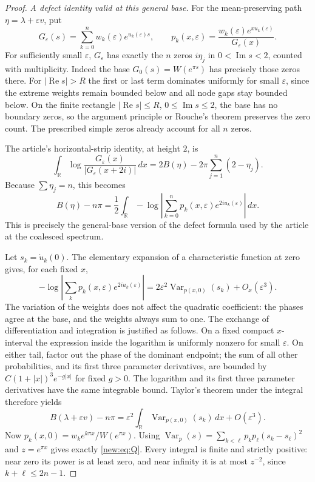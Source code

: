 \begin{proof}
\emph{A defect identity valid at this general base.}
For the mean-preserving path $\eta=\lambda+\varepsilon v$, put
\[
 G_\varepsilon(s)=\sum_{k=0}^n
                 w_k(\varepsilon)e^{u_k(\varepsilon)s},\qquad
 p_k(x,\varepsilon)=
 \frac{w_k(\varepsilon)e^{xu_k(\varepsilon)}}{G_\varepsilon(x)}.
\]
For sufficiently small $\varepsilon$, $G_\varepsilon$ has exactly the $n$
zeros $i\eta_j$ in $0<\operatorname{Im}s<2$, counted with multiplicity.
Indeed the base $G_0(s)=W(e^{\pi s})$ has precisely those zeros there.
For $|\operatorname{Re}s|>R$ the first or last term dominates uniformly
for small $\varepsilon$, since the extreme weights remain bounded below
and all node gaps stay bounded below. On the finite rectangle
$|\operatorname{Re}s|\leq R$, $0\leq\operatorname{Im}s\leq2$, the base
has no boundary zeros, so the argument principle or Rouche's theorem
preserves the zero count. The prescribed simple zeros already account for
all $n$ zeros.

The article's horizontal-strip identity, at height $2$, is
\[
 \int_{\mathbb R}\log\frac{G_\varepsilon(x)}
             {|G_\varepsilon(x+2i)|}\,dx
  =2B(\eta)-2\pi\sum_{j=1}^n(2-\eta_j).
\]
Because $\sum\eta_j=n$, this becomes
\begin{equation}\label{new:eq:defect}
 B(\eta)-n\pi
 =\frac12\int_{\mathbb R}
   -\log\left|\sum_{k=0}^np_k(x,\varepsilon)
                       e^{2iu_k(\varepsilon)}\right|\,dx.
\end{equation}
This is precisely the general-base version of the defect formula used by
the article at the coalesced spectrum.

Let $s_k=\dot u_k(0)$. The elementary expansion of a characteristic
function at zero gives, for each fixed $x$,
\[
 -\log\left|\sum_kp_k(x,\varepsilon)e^{2iu_k(\varepsilon)}\right|
 =2\varepsilon^2\operatorname{Var}_{p(x,0)}(s_k)
      +O_x(\varepsilon^3).
\]
The variation of the weights does not affect the quadratic coefficient:
the phases agree at the base, and the weights always sum to one. The
exchange of differentiation and integration is justified as follows.
On a fixed compact $x$-interval the expression inside the logarithm is
uniformly nonzero for small $\varepsilon$. On either tail, factor out
the phase of the dominant endpoint; the sum of all other probabilities,
and its first three parameter derivatives, are bounded by
$C(1+|x|)^3e^{-g|x|}$ for fixed $g>0$. The logarithm and its first three
parameter derivatives have the same integrable bound. Taylor's theorem
under the integral therefore yields
\[
 B(\lambda+\varepsilon v)-n\pi
 =\varepsilon^2\int_{\mathbb R}
            \operatorname{Var}_{p(x,0)}(s_k)\,dx+O(\varepsilon^3).
\]
Now $p_k(x,0)=w_ke^{k\pi x}/W(e^{\pi x})$. Using
$\operatorname{Var}_p(s)=\sum_{k<\ell}p_kp_\ell(s_k-s_\ell)^2$ and
$z=e^{\pi x}$ gives exactly \eqref{new:eq:Q}. Every integral is finite
and strictly positive: near zero its power is at least zero, and near
infinity it is at most $z^{-2}$, since $k+\ell\leq2n-1$.


\end{proof}
